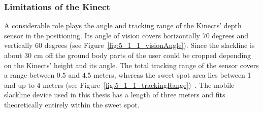 \subsubsection{Limitations of the Kinect} 
A considerable role plays the angle and tracking range of the Kinects' depth sensor in the positioning.
Its angle of vision covers horizontally 70 degrees and vertically 60 degrees (see Figure~\ref{fig:5_1_1_visionAngle}).
Since the slackline is about 30 cm off the ground body parts of the user could be cropped depending on the Kinects' height and its angle.
The total tracking range of the sensor covers a range between 0.5 and 4.5 meters, whereas the sweet spot area lies between 1 and up to 4 meters (see Figure~\ref{fig:5_1_1_trackingRange})~\cite{MicrosoftHIG2014-mh}.
The mobile slackline device used in this thesis has a length of three meters and fits theoretically entirely within the sweet spot.
